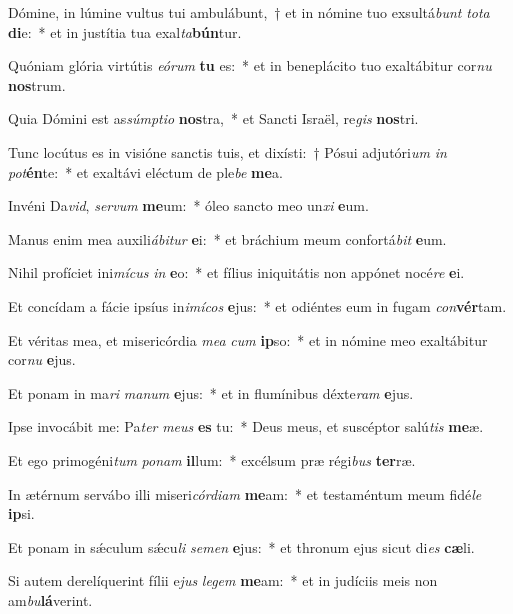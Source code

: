 \item Dómine, in lúmine vultus tui ambulábunt,~† et in nómine tuo exsultá\textit{bunt} \textit{to}\textit{ta} \textbf{di}e:~* et in justítia tua exal\textit{ta}\textbf{bún}tur.
\item Quóniam glória virtútis \textit{e}\textit{ó}\textit{rum} \textbf{tu} es:~* et in beneplácito tuo exaltábitur cor\textit{nu} \textbf{nos}trum.
\item Quia Dómini est as\textit{súmp}\textit{ti}\textit{o} \textbf{nos}tra,~* et Sancti Israël, re\textit{gis} \textbf{nos}tri.
\item Tunc locútus es in visióne sanctis tuis, et dixísti:~† Pósui adjutóri\textit{um} \textit{in} \textit{pot}\textbf{én}te:~* et exaltávi eléctum de ple\textit{be} \textbf{me}a.
\item Invéni Da\textit{vid}, \textit{ser}\textit{vum} \textbf{me}um:~* óleo sancto meo un\textit{xi} \textbf{e}um.
\item Manus enim mea auxili\textit{á}\textit{bi}\textit{tur} \textbf{e}i:~* et bráchium meum confortá\textit{bit} \textbf{e}um.
\item Nihil profíciet ini\textit{mí}\textit{cus} \textit{in} \textbf{e}o:~* et fílius iniquitátis non appónet nocé\textit{re} \textbf{e}i.
\item Et concídam a fácie ipsíus in\textit{i}\textit{mí}\textit{cos} \textbf{e}jus:~* et odiéntes eum in fugam \textit{con}\textbf{vér}tam.
\item Et véritas mea, et misericórdia \textit{me}\textit{a} \textit{cum} \textbf{ip}so:~* et in nómine meo exaltábitur cor\textit{nu} \textbf{e}jus.
\item Et ponam in ma\textit{ri} \textit{ma}\textit{num} \textbf{e}jus:~* et in flumínibus déxte\textit{ram} \textbf{e}jus.
\item Ipse invocábit me: Pa\textit{ter} \textit{me}\textit{us} \textbf{es} tu:~* Deus meus, et suscéptor salú\textit{tis} \textbf{me}æ.
\item Et ego primogéni\textit{tum} \textit{po}\textit{nam} \textbf{il}lum:~* excélsum præ régi\textit{bus} \textbf{ter}ræ.
\item In ætérnum servábo illi miseri\textit{cór}\textit{di}\textit{am} \textbf{me}am:~* et testaméntum meum fidé\textit{le} \textbf{ip}si.
\item Et ponam in sǽculum sǽcu\textit{li} \textit{se}\textit{men} \textbf{e}jus:~* et thronum ejus sicut di\textit{es} \textbf{cæ}li.
\item Si autem derelíquerint fílii e\textit{jus} \textit{le}\textit{gem} \textbf{me}am:~* et in judíciis meis non am\textit{bu}\textbf{lá}verint.
